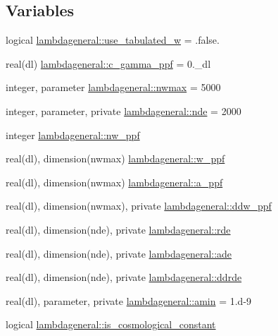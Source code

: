 \subsection*{Variables}
\begin{DoxyCompactItemize}
\item 
logical \mbox{\hyperlink{namespacelambdageneral_af7e90af593ee4c5594024dff73234360}{lambdageneral\+::use\+\_\+tabulated\+\_\+w}} = .false.
\item 
real(dl) \mbox{\hyperlink{namespacelambdageneral_a85e391fa1c34171d68cc178f0d0b9d8a}{lambdageneral\+::c\+\_\+gamma\+\_\+ppf}} = 0.\+\_\+dl
\item 
integer, parameter \mbox{\hyperlink{namespacelambdageneral_a72ab4fcacd74a66fe577794d5294864b}{lambdageneral\+::nwmax}} = 5000
\item 
integer, parameter, private \mbox{\hyperlink{namespacelambdageneral_ae21da0c8fff86159b789dee9579bd7d5}{lambdageneral\+::nde}} = 2000
\item 
integer \mbox{\hyperlink{namespacelambdageneral_ab52783406de69e4d228acb0d9fefc1c6}{lambdageneral\+::nw\+\_\+ppf}}
\item 
real(dl), dimension(nwmax) \mbox{\hyperlink{namespacelambdageneral_a7e860fa5106918f839ea3f7f76862f56}{lambdageneral\+::w\+\_\+ppf}}
\item 
real(dl), dimension(nwmax) \mbox{\hyperlink{namespacelambdageneral_a01ecf8d62de8dba202404c6c64743084}{lambdageneral\+::a\+\_\+ppf}}
\item 
real(dl), dimension(nwmax), private \mbox{\hyperlink{namespacelambdageneral_abf25efe08b2d793e499129d1bbd0ad61}{lambdageneral\+::ddw\+\_\+ppf}}
\item 
real(dl), dimension(nde), private \mbox{\hyperlink{namespacelambdageneral_addbcd4776d6d01e9839013990b02fd91}{lambdageneral\+::rde}}
\item 
real(dl), dimension(nde), private \mbox{\hyperlink{namespacelambdageneral_a3c9598fcf92daa2c3f6715e256e50c98}{lambdageneral\+::ade}}
\item 
real(dl), dimension(nde), private \mbox{\hyperlink{namespacelambdageneral_a4076e8b34d8ff5774ed58d456c862c14}{lambdageneral\+::ddrde}}
\item 
real(dl), parameter, private \mbox{\hyperlink{namespacelambdageneral_a45e4f8d95a544fe1221e6ff186d9f4b9}{lambdageneral\+::amin}} = 1.d-\/9
\item 
logical \mbox{\hyperlink{namespacelambdageneral_a8ac10c80c54ab03dde5512cfa1baf5d2}{lambdageneral\+::is\+\_\+cosmological\+\_\+constant}}
\end{DoxyCompactItemize}


